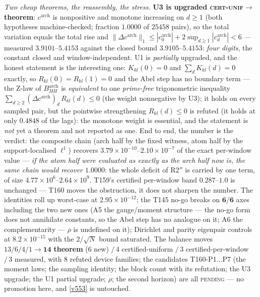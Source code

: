 \documentclass[11pt,a4paper]{article}
\begin{document}
\emph{Two cheap theorems, the reassembly, the stress.} \textbf{U3 is upgraded
\textsc{cert-unif}${}\to{}$theorem}: $c^{\mathrm{arch}}$ is nonpositive and
monotone increasing on $d\ge1$ (both hypotheses machine-checked; fraction
$1.0000$ of $25458$ pairs), so the total variation equals the total rise and
$\|\Delta c^{\mathrm{arch}}\|_1\le|c^{\mathrm{arch}}_0|+2\sup_{d\ge1}
|c^{\mathrm{arch}}_d|<6$ --- measured $3.9101$--$5.4153$ against the closed bound
$3.9105$--$5.4153$: \emph{four digits}, the constant closed and
window-independent. U1 is \emph{partially} upgraded, and the honest statement is
the interesting one: $K_{kl}(0)=0$ and $\sum_dK_{kl}(d)=0$ exactly, so
$R_{kl}(0)=R_{kl}(1)=0$ and the Abel step has no boundary term --- the Z-law of
$B^{\mathrm{arch}}_{HH}$ is \emph{equivalent} to one \emph{prime-free}
trigonometric inequality $\sum_{d\ge2}(\Delta c^{\mathrm{arch}})_d\,R_{kl}(d)
\le0$ (the weight nonnegative by U3); it holds on every sampled pair, but the
pointwise strengthening $R_{kl}(d)\le0$ is refuted (it holds at only $0.4848$ of
the lags): the monotone weight is essential, and the statement is \emph{not} yet
a theorem and not reported as one. End to end, the number is the verdict: the
composite chain (arch half by the fixed witness, atom half by the
support-localised $\ell^1$) recovers $3.79\times10^{-10}$--$2.10\times10^{-7}$ of
the exact per-window value --- \emph{if the atom half were evaluated as exactly as
the arch half now is, the same chain would recover $1.0000$}: the whole deficit
of R2$''$ is carried by one term, of size $4.77\times10^{6}$--$2.64\times10^{9}$.
T159's certified per-window band $0.287$--$1.0$ is unchanged --- T160 moves the
obstruction, it does not sharpen the number. The identities roll up worst-case at
$2.95\times10^{-12}$; the T145 no-go breaks on $\mathbf{6/6}$ axes including the
two new ones (A5 the gauge/moment structure --- the no-go form does not
annihilate constants, so the Abel step has no analogue on it; A6 the
complementarity --- $\rho$ is undefined on it); Dirichlet and parity eigenpair
controls at $8.2\times10^{-15}$ with the $2/\sqrt N$ bound saturated. The balance
moves $13/6/4/1\to\mathbf{14}$ \textbf{theorem} ($6$ new) $/\,4$
certified-uniform $/\,3$ certified-per-window $/\,3$ measured, with $8$ refuted
device families; the candidates T160-P1$\ldots$P7 (the moment laws; the sampling
identity; the block count with its refutation; the U3 upgrade; the U1 partial
upgrade; $\rho$; the second horizon) are all \textsc{pending} --- no promotion
here, and \vref{v553} is untouched.
\end{document}

